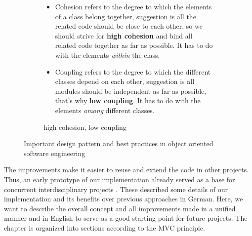 \begin{figure}
\begin{subfigure}[b]{0.68\textwidth}
\begin{small}
\begin{ssfont}
\begin{itemize}
\item Cohesion refers to the degree to which the elements of a class belong together, suggestion is all the related code should be close to each other, so we should strive for \textbf{high cohesion} and bind all related code together as far as possible. It has to do with the elements \textit{within} the class. %
\item Coupling refers to the degree to which the different classes depend on each other, suggestion is all modules should be independent as far as possible, that's why \textbf{low coupling}. It has to do with the elements \textit{among} different classes. %
\end{itemize}
\end{ssfont}
\end{small}
\caption{high cohesion, low coupling\footnotemark}
\label{fig:coh}
\end{subfigure}
\caption{Important design pattern and best practices in object oriented software engineering}
\label{fig:patterns}
\end{figure}

%

The improvements make it easier to reuse and extend the code in other projects. Thus, an early prototype of our implementation already served as a base for concurrent interdisciplinary projects \cite{fischer2016idp,feil2016idp}. These described some details of our implementation and its benefits over previous approaches in German. Here, we want to describe the overall concept and all improvements made in a unified manner and in English to serve as a good starting point for future projects. The chapter is organized into sections according to the MVC principle.

